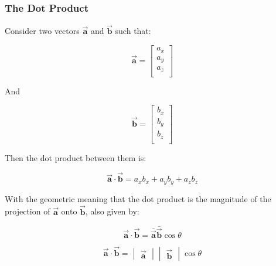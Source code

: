 \documentclass[11pt]{article}
\begin{document}
\subsubsection{The Dot Product}
Consider two vectors $\vec{\bm{a}}$ and $\vec{\bm{b}}$ such that:

\begin{equation*}
    \vec{\bm{a}} = \begin{bmatrix}
        a_x \\
        a_y \\
        a_z \\
    \end{bmatrix}
\end{equation*}

And

\begin{equation*}
    \vec{\bm{b}} = \begin{bmatrix}
        b_x \\
        b_y \\
        b_z \\
    \end{bmatrix}
\end{equation*}

\noindent
Then the dot product between them is:

\begin{equation*}
    \vec{\bm{a}} \cdot \vec{\bm{b}} = a_xb_x + a_yb_y + a_zb_z
\end{equation*}

\noindent
With the geometric meaning that the dot product is the magnitude of the projection of $\vec{\bm{a}}$ onto $\vec{\bm{b}}$, also given by:

\begin{equation*}
    \vec{\bm{a}} \cdot \vec{\bm{b}} = \bar{\vec{\bm{a}}}\bar{\vec{\bm{b}}}\cos{\theta}
\end{equation*}

\begin{equation*}
    \vec{\bm{a}} \cdot \vec{\bm{b}} = \begin{vmatrix}
        \vec{\bm{a}}
    \end{vmatrix}\begin{vmatrix}
        \vec{\bm{b}}
    \end{vmatrix}
    \cos{\theta}
\end{equation*}
\end{document}
